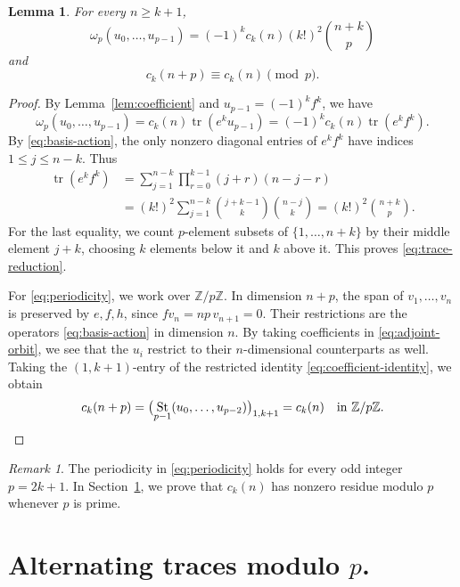 \documentclass[12pt]{article}
\newtheorem{lemma}[theorem]{Lemma}
\theoremstyle{definition}
\theoremstyle{remark}
\newtheorem{remark}[theorem]{Remark}
\DeclareMathOperator{\St}{St}
\DeclareMathOperator{\tr}{tr}
\newcommand{\Z}{\mathbb Z}
\begin{document}
\begin{lemma}\label{lem:trace-periodicity}
For every $n\geq k+1$,
\begin{equation}\label{eq:trace-reduction}
 \omega_p(u_0,\ldots,u_{p-1})
 =(-1)^kc_k(n)(k!)^2\binom{n+k}{p}
\end{equation}
and
\begin{equation}\label{eq:periodicity}
 c_k(n+p)\equiv c_k(n)\pmod p.
\end{equation}
\end{lemma}

\begin{proof}
By Lemma~\ref{lem:coefficient} and $u_{p-1}=(-1)^kf^k$, we have
\[
 \omega_p(u_0,\ldots,u_{p-1})
 =c_k(n)\tr(e^ku_{p-1})=(-1)^kc_k(n)\tr(e^kf^k).
\]
By \eqref{eq:basis-action}, the only nonzero diagonal entries of
$e^kf^k$ have indices $1\leq j\leq n-k$. Thus
\begin{equation}\label{eq:binomial-trace}
\begin{aligned}
 \tr(e^kf^k)
 &=\sum_{j=1}^{n-k}\prod_{r=0}^{k-1}(j+r)(n-j-r)\\
 &=(k!)^2\sum_{j=1}^{n-k}\binom{j+k-1}{k}\binom{n-j}{k}
 =(k!)^2\binom{n+k}{p}.
\end{aligned}
\end{equation}
For the last equality, we count $p$-element subsets of
$\{1,\ldots,n+k\}$ by their middle element $j+k$, choosing $k$
elements below it and $k$ above it. This proves
\eqref{eq:trace-reduction}.

For \eqref{eq:periodicity}, we work over $\Z/p\Z$. In dimension $n+p$,
the span of $v_1,\ldots,v_n$ is preserved by $e,f,h$, since
$fv_n=np\,v_{n+1}=0$. Their restrictions are the operators
\eqref{eq:basis-action} in dimension $n$. By taking coefficients in
\eqref{eq:adjoint-orbit}, we see that the $u_i$ restrict to their
$n$-dimensional counterparts as well. Taking the $(1,k+1)$-entry
of the restricted identity \eqref{eq:coefficient-identity}, we obtain
\[
 c_k(n+p)
 =\bigl(\St_{p-1}(u_0,\ldots,u_{p-2})\bigr)_{1,k+1}
 =c_k(n)\quad\text{in }\Z/p\Z.\qedhere
\]
\end{proof}

\begin{remark}\label{rem:composite-periodicity}
The periodicity in \eqref{eq:periodicity} holds for every odd integer
$p=2k+1$. In Section~\ref{sec:finite-field}, we prove that $c_k(n)$
has nonzero residue modulo $p$ whenever $p$ is prime.
\end{remark}

\section{Alternating traces modulo \texorpdfstring{$p$}{p}.}\label{sec:finite-field}
\end{document}
